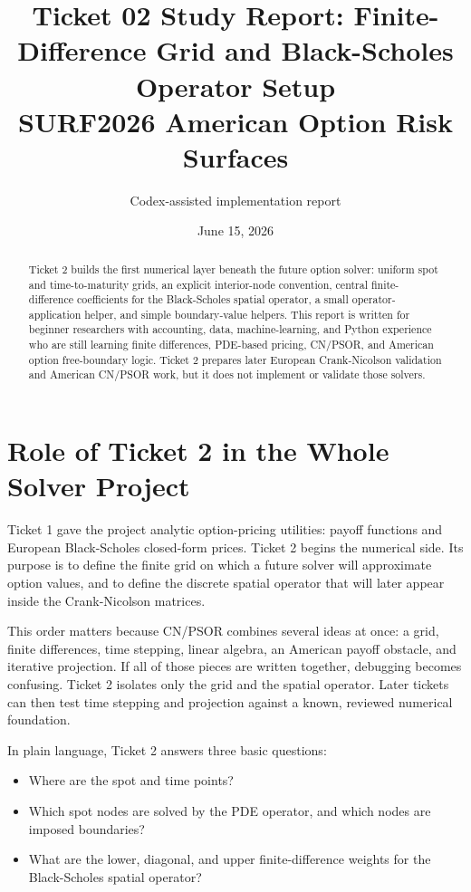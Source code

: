 \documentclass[11pt,a4paper]{article}
\title{\textbf{Ticket 02 Study Report: Finite-Difference Grid and Black-Scholes Operator Setup}\\
\large SURF2026 American Option Risk Surfaces}
\author{Codex-assisted implementation report}
\date{June 15, 2026}
\begin{document}
\maketitle

\begin{abstract}
Ticket 2 builds the first numerical layer beneath the future option solver: uniform spot and
time-to-maturity grids, an explicit interior-node convention, central finite-difference
coefficients for the Black-Scholes spatial operator, a small operator-application helper, and
simple boundary-value helpers. This report is written for beginner researchers with accounting,
data, machine-learning, and Python experience who are still learning finite differences,
PDE-based pricing, CN/PSOR, and American option free-boundary logic. Ticket 2 prepares later
European Crank-Nicolson validation and American CN/PSOR work, but it does not implement or
validate those solvers.
\end{abstract}

\tableofcontents
\newpage

\section{Role of Ticket 2 in the Whole Solver Project}

Ticket 1 gave the project analytic option-pricing utilities: payoff functions and European
Black-Scholes closed-form prices. Ticket 2 begins the numerical side. Its purpose is to define
the finite grid on which a future solver will approximate option values, and to define the
discrete spatial operator that will later appear inside the Crank-Nicolson matrices.

This order matters because CN/PSOR combines several ideas at once: a grid, finite differences,
time stepping, linear algebra, an American payoff obstacle, and iterative projection. If all of
those pieces are written together, debugging becomes confusing. Ticket 2 isolates only the grid
and the spatial operator. Later tickets can then test time stepping and projection against a
known, reviewed numerical foundation.

In plain language, Ticket 2 answers three basic questions:
\begin{itemize}
  \item Where are the spot and time points?
  \item Which spot nodes are solved by the PDE operator, and which nodes are imposed boundaries?
  \item What are the lower, diagonal, and upper finite-difference weights for the Black-Scholes
        spatial operator?
\end{itemize}
\end{document}
